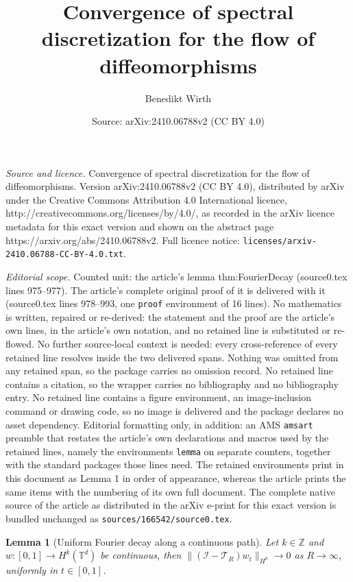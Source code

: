 \documentclass[10pt,a4paper]{amsart}
\title{Convergence of spectral discretization for the flow of diffeomorphisms}
\author{Benedikt Wirth}
\date{Source: arXiv:2410.06788v2 (CC BY 4.0)}
\newtheorem{lemma}{Lemma}
\newcommand{\Id}{{\mathcal{I}}}
\newcommand{\T}{\mathbb{T}}
\newcommand{\Z}{\mathbb{Z}}
\newcommand{\trunc}[1][R]{\mathcal{T}_{#1}}
\begin{document}
\maketitle

\noindent\emph{Source and licence.} Convergence of spectral discretization for the flow of diffeomorphisms. Version arXiv:2410.06788v2 (CC BY 4.0), distributed by arXiv under the Creative Commons Attribution 4.0 International licence, http://creativecommons.org/licenses/by/4.0/, as recorded in the arXiv licence metadata for this exact version and shown on the abstract page https://arxiv.org/abs/2410.06788v2. Full licence notice: \texttt{licenses/arxiv-2410.06788-CC-BY-4.0.txt}.\par\smallskip

\noindent\textit{Editorial scope.} Counted unit: the article's lemma thm:FourierDecay (source0.tex lines 975--977). The article's complete original proof of it is delivered with it (source0.tex lines 978--993, one \texttt{proof} environment of 16 lines). No mathematics is written, repaired or re-derived: the statement and the proof are the article's own lines, in the article's own notation, and no retained line is substituted or re-flowed.  No further source-local context is needed: every cross-reference of every retained line resolves inside the two delivered spans.  Nothing was omitted from any retained span, so the package carries no omission record.  No retained line contains a citation, so the wrapper carries no bibliography and no bibliography entry.  No retained line contains a figure environment, an image-inclusion command or drawing code, so no image is delivered and the package declares no asset dependency.  Editorial formatting only, in addition: an AMS \texttt{amsart} preamble that restates the article's own declarations and macros used by the retained lines, namely the environments \texttt{lemma} on separate counters, together with the standard packages those lines need.  The retained environments print in this document as Lemma 1 in order of appearance, whereas the article prints the same items with the numbering of its own full document.  The complete native source of the article as distributed in the arXiv e-print for this exact version is bundled unchanged as \texttt{sources/166542/source0.tex}.
\begin{lemma}[Uniform Fourier decay along a continuous path]\label{thm:FourierDecay}
Let $k\in\Z$ and $w:[0,1]\to H^k(\T^d)$ be continuous, then $\|(\Id-\trunc)w_t\|_{H^k}\to0$ as $R\to\infty$, uniformly in $t\in[0,1]$.
\end{lemma}
\end{document}
